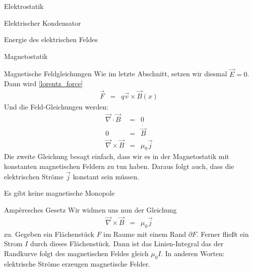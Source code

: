 \begin{chapter}{\titlestr}
\begin{section}{Elektrostatik}
\begin{subsection}{Elektrischer Kondensator}
\begin{subsubsection}{Energie des elektrischen Feldes}
\end{subsubsection}
\end{subsection}


\end{section}


\begin{section}{Magnetostatik}
\begin{subsection}{Magnetische Feldgleichungen}
Wie im letzte Abschnitt, setzen wir diesmal $\vec{E}=0$. Dann wird \ref{lorentz_force}
\begin{eqnarray*}
\vec{F} &=& q\vec{v}\times\vec{B}(x)
\end{eqnarray*}
Und die Feld-Gleichungen werden:
\begin{eqnarray*}
\vec{\nabla}\cdot\vec{B} &=& 0\\
0 &=& \dot{\vec{B}}\\
\vec{\nabla}\times\vec{B} &=& \mu_0\vec{j}
\end{eqnarray*}
Die zweite Gleichung besagt einfach, dass wir es in der Magnetostatik mit konstanten magnetischen Feldern zu tun haben.
Daraus folgt auch, dass die elektrischen Ströme $\vec{j}$ konstant sein müssen.
\end{subsection}

\begin{subsection}{Es gibt keine magnetische Monopole}
\end{subsection}

\begin{subsection}{Ampèresches Gesetz}
Wir widmen uns nun der Gleichung
\begin{eqnarray*}
\vec{\nabla}\times\vec{B} &=& \mu_0\vec{j}
\end{eqnarray*}
zu. Gegeben ein Flächenstück $F$ im Raume mit einem Rand $\partial F$. Ferner fließt ein Strom $I$ durch dieses Flächenstück. Dann ist das Linien-Integral das der Randkurve folgt des magnetischen Feldes
gleich $\mu_0I$. In anderen Worten: elektrische Ströme erzeugen magnetische Felder.
\end{subsection}


\end{section}
\end{chapter}
